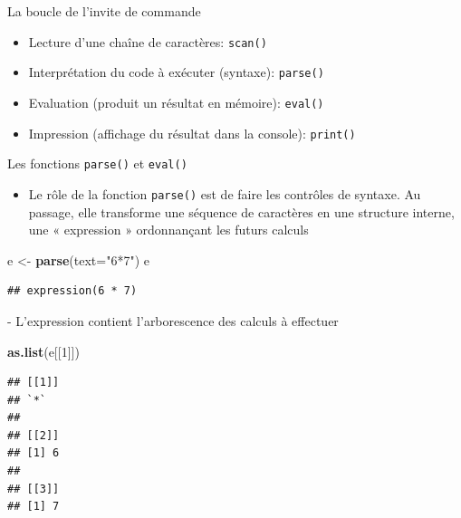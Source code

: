 \documentclass[
  ignorenonframetext,
]{beamer}
\newenvironment{Shaded}{\begin{snugshade}}{\end{snugshade}}
\newcommand{\AttributeTok}[1]{\textcolor[rgb]{0.13,0.29,0.53}{#1}}
\newcommand{\DecValTok}[1]{\textcolor[rgb]{0.00,0.00,0.81}{#1}}
\newcommand{\FunctionTok}[1]{\textcolor[rgb]{0.13,0.29,0.53}{\textbf{#1}}}
\newcommand{\NormalTok}[1]{#1}
\newcommand{\OtherTok}[1]{\textcolor[rgb]{0.56,0.35,0.01}{#1}}
\newcommand{\StringTok}[1]{\textcolor[rgb]{0.31,0.60,0.02}{#1}}
\providecommand{\tightlist}{%
  \setlength{\itemsep}{0pt}\setlength{\parskip}{0pt}}
\begin{document}
\begin{frame}[fragile]{La boucle de l'invite de commande}
\protect\hypertarget{la-boucle-de-linvite-de-commande}{}
\begin{itemize}
\tightlist
\item
  Lecture d'une chaîne de caractères: \texttt{scan()}
\item
  Interprétation du code à exécuter (syntaxe): \texttt{parse()}
\item
  Evaluation (produit un résultat en mémoire): \texttt{eval()}
\item
  Impression (affichage du résultat dans la console): \texttt{print()}
\end{itemize}
\end{frame}

\begin{frame}[fragile]{Les fonctions \texttt{parse()} et
\texttt{eval()}}
\protect\hypertarget{les-fonctions-parse-et-eval}{}
\begin{itemize}
\tightlist
\item
  Le rôle de la fonction \texttt{parse()} est de faire les contrôles de
  syntaxe. Au passage, elle transforme une séquence de caractères en une
  structure interne, une « expression » ordonnançant les futurs calculs
\end{itemize}

\tiny

\begin{Shaded}
\begin{Highlighting}[]
\NormalTok{e }\OtherTok{\textless{}{-}} \FunctionTok{parse}\NormalTok{(}\AttributeTok{text=}\StringTok{"6*7"}\NormalTok{)}
\NormalTok{e}
\end{Highlighting}
\end{Shaded}

\begin{verbatim}
## expression(6 * 7)
\end{verbatim}

\normalsize - L'expression contient l'arborescence des calculs à
effectuer

\tiny

\begin{Shaded}
\begin{Highlighting}[]
\FunctionTok{as.list}\NormalTok{(e[[}\DecValTok{1}\NormalTok{]])}
\end{Highlighting}
\end{Shaded}

\begin{verbatim}
## [[1]]
## `*`
## 
## [[2]]
## [1] 6
## 
## [[3]]
## [1] 7
\end{verbatim}


\end{frame}
\end{document}
